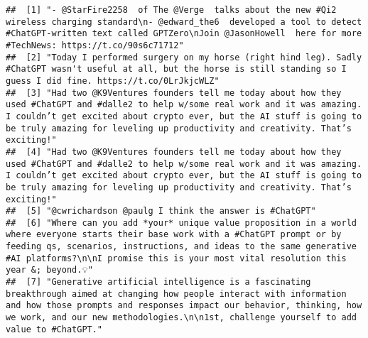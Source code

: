 \documentclass[
]{article}
\newenvironment{Shaded}{\begin{snugshade}}{\end{snugshade}}
\newcommand{\FunctionTok}[1]{\textcolor[rgb]{0.00,0.00,0.00}{#1}}
\newcommand{\NormalTok}[1]{#1}
\newcommand{\SpecialCharTok}[1]{\textcolor[rgb]{0.00,0.00,0.00}{#1}}
\newcommand{\StringTok}[1]{\textcolor[rgb]{0.31,0.60,0.02}{#1}}
\begin{document}
\begin{Shaded}
\end{Shaded}

\begin{verbatim}
##  [1] "- @StarFire2258  of The @Verge  talks about the new #Qi2 wireless charging standard\n- @edward_the6  developed a tool to detect #ChatGPT-written text called GPTZero\nJoin @JasonHowell  here for more #TechNews: https://t.co/90s6c71712"                                                                                      
##  [2] "Today I performed surgery on my horse (right hind leg). Sadly #ChatGPT wasn't useful at all, but the horse is still standing so I guess I did fine. https://t.co/0LrJkjcWLZ"                                                                                                                                                    
##  [3] "Had two @K9Ventures founders tell me today about how they used #ChatGPT and #dalle2 to help w/some real work and it was amazing. I couldn’t get excited about crypto ever, but the AI stuff is going to be truly amazing for leveling up productivity and creativity. That’s exciting!"                                         
##  [4] "Had two @K9Ventures founders tell me today about how they used #ChatGPT and #dalle2 to help w/some real work and it was amazing. I couldn’t get excited about crypto ever, but the AI stuff is going to be truly amazing for leveling up productivity and creativity. That’s exciting!"                                         
##  [5] "@cwrichardson @paulg I think the answer is #ChatGPT"                                                                                                                                                                                                                                                                            
##  [6] "Where can you add *your* unique value proposition in a world where everyone starts their base work with a #ChatGPT prompt or by feeding qs, scenarios, instructions, and ideas to the same generative #AI platforms?\n\nI promise this is your most vital resolution this year &; beyond.💡"                                    
##  [7] "Generative artificial intelligence is a fascinating breakthrough aimed at changing how people interact with information and how those prompts and responses impact our behavior, thinking, how we work, and our new methodologies.\n\n1st, challenge yourself to add value to #ChatGPT."                                        

\end{verbatim}
\end{document}
